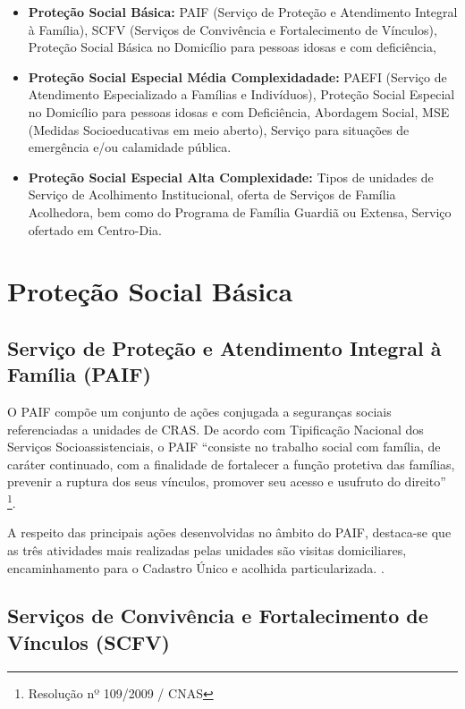 \documentclass[
  letterpaper,
  DIV=11,
  numbers=noendperiod]{scrreprt}
\begin{document}
\begin{itemize}
\item
  \textbf{Proteção Social Básica:} PAIF (Serviço de Proteção e
  Atendimento Integral à Família), SCFV (Serviços de Convivência e
  Fortalecimento de Vínculos), Proteção Social Básica no Domicílio para
  pessoas idosas e com deficiência,
\item
  \textbf{Proteção Social Especial Média Complexidadade:} PAEFI (Serviço
  de Atendimento Especializado a Famílias e Indivíduos), Proteção Social
  Especial no Domicílio para pessoas idosas e com Deficiência, Abordagem
  Social, MSE (Medidas Socioeducativas em meio aberto), Serviço para
  situações de emergência e/ou calamidade pública.
\item
  \textbf{Proteção Social Especial Alta Complexidade:} Tipos de unidades
  de Serviço de Acolhimento Institucional, oferta de Serviços de Família
  Acolhedora, bem como do Programa de Família Guardiã ou Extensa,
  Serviço ofertado em Centro-Dia.
\end{itemize}

\section{Proteção Social Básica}\label{proteuxe7uxe3o-social-buxe1sica}

\subsection{Serviço de Proteção e Atendimento Integral à Família
(PAIF)}\label{serviuxe7o-de-proteuxe7uxe3o-e-atendimento-integral-uxe0-famuxedlia-paif}

O PAIF compõe um conjunto de ações conjugada a seguranças sociais
referenciadas a unidades de CRAS. De acordo com Tipificação Nacional dos
Serviços Socioassistenciais, o PAIF ``consiste no trabalho social com
família, de caráter continuado, com a finalidade de fortalecer a função
protetiva das famílias, prevenir a ruptura dos seus vínculos, promover
seu acesso e usufruto do direito'' \footnote{Resolução nº 109/2009 /
  CNAS}.

A respeito das principais ações desenvolvidas no âmbito do PAIF,
destaca-se que as três atividades mais realizadas pelas unidades são
visitas domiciliares, encaminhamento para o Cadastro Único e acolhida
particularizada. .

\subsection{Serviços de Convivência e Fortalecimento de Vínculos
(SCFV)}\label{serviuxe7os-de-convivuxeancia-e-fortalecimento-de-vuxednculos-scfv}
\end{document}
